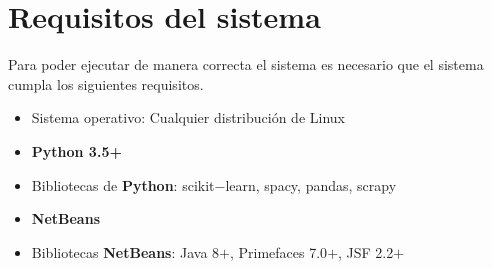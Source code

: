 \section{Requisitos del sistema}

Para poder ejecutar de manera correcta el sistema es necesario que el sistema cumpla los siguientes requisitos.

\begin{itemize}
  \item Sistema operativo: Cualquier distribución de Linux
  \item \textbf{Python 3.5+}
  \item Bibliotecas de \textbf{Python}: scikit$-$learn, spacy, pandas, scrapy
  \item \textbf{NetBeans}
  \item Bibliotecas \textbf{NetBeans}: Java 8$+$, Primefaces 7.0$+$, JSF 2.2$+$ 
  
\end{itemize}